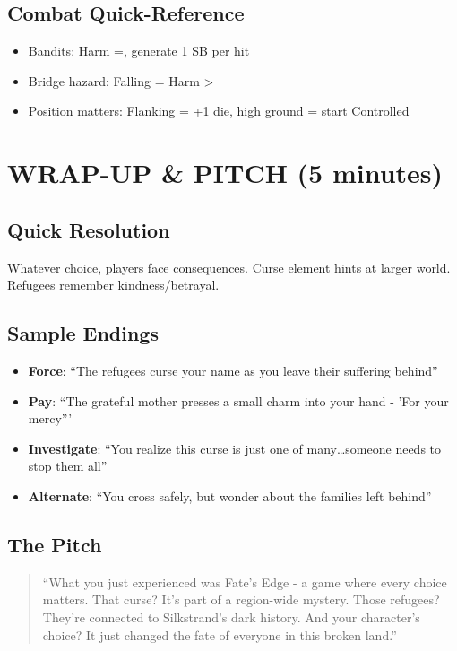 \documentclass[12pt]{article}
\begin{document}
\subsection*{Combat Quick-Reference}
\begin{itemize}
\item Bandits: Harm =, generate 1 SB per hit
\item Bridge hazard: Falling = Harm >
\item Position matters: Flanking = +1 die, high ground = start Controlled
\end{itemize}

\section{WRAP-UP \& PITCH (5 minutes)}

\subsection*{Quick Resolution}
Whatever choice, players face consequences. Curse element hints at larger world. Refugees remember kindness/betrayal.

\subsection*{Sample Endings}
\begin{itemize}
\item \textbf{Force}: ``The refugees curse your name as you leave their suffering behind''
\item \textbf{Pay}: ``The grateful mother presses a small charm into your hand - 'For your mercy'''
\item \textbf{Investigate}: ``You realize this curse is just one of many\dots someone needs to stop them all''
\item \textbf{Alternate}: ``You cross safely, but wonder about the families left behind''
\end{itemize}

\subsection*{The Pitch}
\begin{quote}
``What you just experienced was Fate's Edge - a game where every choice matters. That curse? It's part of a region-wide mystery. Those refugees? They're connected to Silkstrand's dark history. And your character's choice? It just changed the fate of everyone in this broken land.''
\end{quote}
\end{document}
